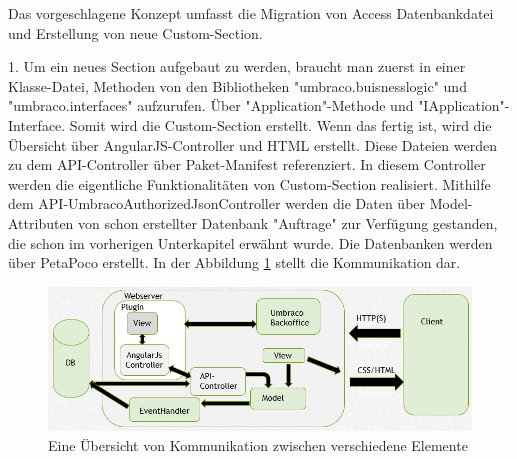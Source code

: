 Das vorgeschlagene Konzept umfasst die Migration von Access Datenbankdatei und Erstellung von neue Custom-Section. 

1. Um ein neues Section aufgebaut zu werden, braucht man zuerst in einer Klasse-Datei, Methoden von den Bibliotheken "umbraco.buisnesslogic" und "umbraco.interfaces" aufzurufen. Über "Application"-Methode und "IApplication"-Interface. Somit wird die Custom-Section erstellt. Wenn das fertig ist, wird die Übersicht über AngularJS-Controller und HTML erstellt. Diese Dateien werden zu dem API-Controller über Paket-Manifest referenziert. In diesem Controller werden die eigentliche Funktionalitäten von Custom-Section realisiert. Mithilfe dem API-UmbracoAuthorizedJsonController werden die Daten über Model-Attributen von schon erstellter Datenbank "Auftrage" zur Verfügung gestanden, die schon im vorherigen Unterkapitel erwähnt wurde. Die Datenbanken werden über PetaPoco erstellt. In der Abbildung \ref{fig:CustomSection}  stellt die Kommunikation dar. 
 
 \begin{figure}[h]
 	\centering
 	\includegraphics[width=1\linewidth]{Graphics/CustomSection.png}
 	\caption[Shop]{Eine Übersicht von Kommunikation zwischen verschiedene Elemente}
 	\label{fig:CustomSection}
 \end{figure}
 
